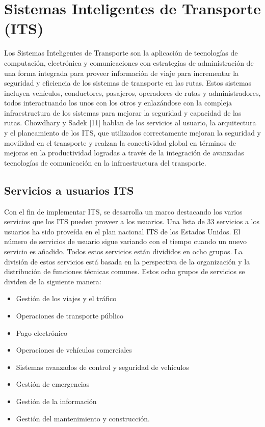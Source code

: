 \section{Sistemas Inteligentes de Transporte (ITS)}

Los Sistemas Inteligentes de Transporte son la aplicación de tecnologías de computación, electrónica y comunicaciones con estrategias de administración de una forma integrada para proveer información de viaje para incrementar la seguridad y eficiencia de los sistemas de transporte en las rutas. Estos sistemas incluyen vehículos, conductores, pasajeros, operadores de rutas y administradores, todos interactuando los unos con los otros y enlazándose con la compleja infraestructura de los sistemas para mejorar la seguridad y capacidad de las rutas. Chowdhary y Sadek [11] hablan de los servicios al usuario, la arquitectura y el planeamiento de los ITS, que utilizados correctamente mejoran la seguridad y movilidad en el transporte y realzan la conectividad global en términos de mejoras en la productividad logradas a través de la integración de avanzadas tecnologías de comunicación en la infraestructura del transporte.

\subsection{Servicios a usuarios ITS}

Con el fin de implementar ITS, se desarrolla un marco destacando los varios servicios que los ITS pueden proveer a los usuarios. Una lista de 33 servicios a los usuarios ha sido proveída en el plan nacional ITS de los Estados Unidos. El número de servicios de usuario sigue variando con el tiempo cuando un nuevo servicio es añadido. Todos estos servicios están divididos en ocho grupos. La división de estos servicios está basada en la perspectiva de la organización y la distribución de funciones técnicas comunes. Estos ocho grupos de servicios se dividen de la siguiente manera:

\begin{itemize}
\item Gestión de los viajes y el tráfico

\item Operaciones de transporte público

\item Pago electrónico

\item Operaciones de vehículos comerciales

\item Sistemas avanzados de control y seguridad de vehículos

\item Gestión de emergencias

\item Gestión de la información

\item Gestión del mantenimiento y construcción.
\end{itemize}

